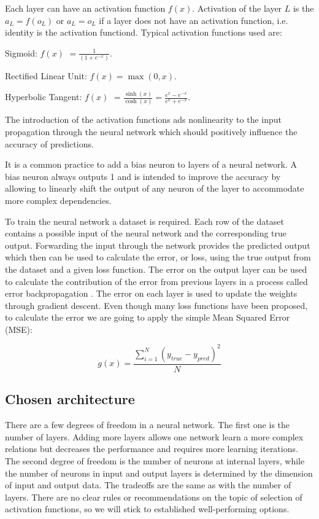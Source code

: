 Each layer can have an activation function $ f(x) $. Activation of the layer $ L $ is the $ a_L = f(o_L) $ or $a_L = o_L$ if a layer does not have an activation function, i.e. identity is the activation functiond. Typical activation functions used are:

\vspace{4pt}
Sigmoid: $ f(x) $ \Large $ = \frac{1}{(1 + e^{-x})} $.
\normalsize

\vspace{4pt}
Rectified Linear Unit: $ f(x) = \max(0, x) $.

Hyperbolic Tangent: $ f(x) $ \Large $ = \frac{\sinh(x)}{\cosh(x)} = \frac{e^x - e^{-x}}{e^x + e^{-x}}$.
\normalsize
\vspace{4pt}

The introduction of the activation functions ads nonlinearity to the input propagation through the neural network which should positively influence the accuracy of predictions.

It is a common practice to add a bias neuron to layers of a neural network. A bias neuron always outputs 1 and is intended to improve the accuracy by allowing to linearly shift the output of any neuron of the layer to accommodate more complex dependencies.

To train the neural network a dataset is required. Each row of the dataset contains a possible input of the neural network and the corresponding true output. Forwarding the input through the network provides the predicted output which then can be used to calculate the error, or loss, using the true output from the dataset and a given loss function. The error on the output layer can be used to calculate the contribution of the error from previous layers in a process called error backpropagation \cite{13}. The error on each layer is used to update the weights through gradient descent. Even though many loss functions have been proposed, to calculate the error we are going to apply the simple Mean Squared Error (MSE):

$$ g(x) = \frac{\sum_{i=1}^{N} (y_{true} - y_{pred})^2}{N} $$

\subsection{Chosen architecture} \label{chosen_architecture}

There are a few degrees of freedom in a neural network. The first one is the number of layers. Adding more layers allows one network learn a more complex relations but decreases the performance and requires more learning iterations. The second degree of freedom is the number of neurons at internal layers, while the number of neurons in input and output layers is determined by the dimension of input and output data. The tradeoffs are the same as with the number of layers. There are no clear rules or recommendations on the topic of selection of activation functions, so we will stick to established well-performing options.


